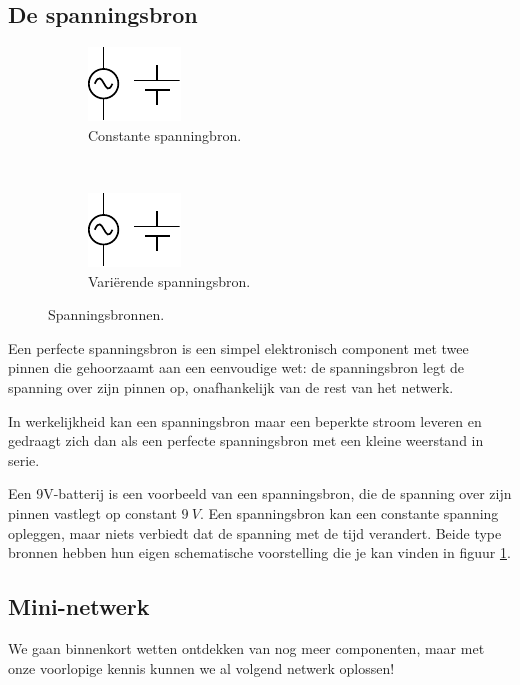 \documentclass{article}
\begin{document}
		\subsection{De spanningsbron}

			\begin{figure}[hbtp]
				\centering
				\begin{subfigure}[b]{0.4\linewidth}
					\centering
					\includegraphics[width=0.2\linewidth]{vc}
					\caption{Constante spanningbron.}
				\end{subfigure}
				~
				\begin{subfigure}[b]{0.4\linewidth}
					\centering
					\includegraphics[width=0.2\linewidth]{vt}
					\caption{Vari\"erende spanningsbron.}
				\end{subfigure}
				\caption{Spanningsbronnen.}
				\label{fig:vbron}
			\end{figure}
			 Een perfecte spanningsbron is een simpel elektronisch component met twee pinnen die gehoorzaamt aan een eenvoudige wet: de spanningsbron legt de spanning over zijn pinnen op, onafhankelijk van de rest van het netwerk.
			 
			 In werkelijkheid kan een spanningsbron maar een beperkte stroom leveren en gedraagt zich dan als een perfecte spanningsbron met een kleine weerstand in serie. 
			 
			 Een 9V-batterij is een voorbeeld van een spanningsbron, die de spanning over zijn pinnen vastlegt op constant $9~V$. Een spanningsbron kan een constante spanning opleggen, maar niets verbiedt dat de spanning met de tijd verandert. Beide type bronnen hebben hun eigen schematische voorstelling die je kan vinden in figuur \ref{fig:vbron}.

		\subsection{Mini-netwerk}
			We gaan binnenkort wetten ontdekken van nog meer componenten, maar met onze voorlopige kennis kunnen we al volgend netwerk oplossen!
\end{document}
